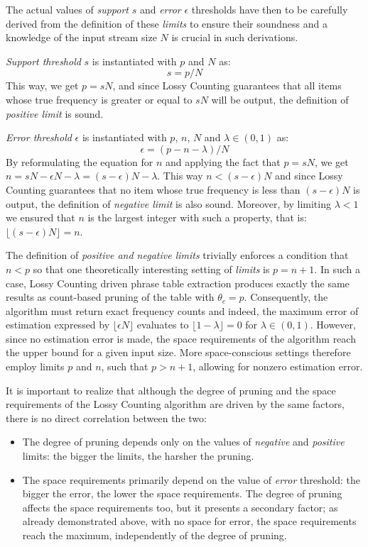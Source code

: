 The actual values of \emph{support} $s$ and \emph{error} $\epsilon$ thresholds have then
to be carefully derived from the definition of these \emph{limits} to ensure their soundness and
a knowledge of the input stream size $N$ is crucial in such derivations.

\emph{Support threshold} $s$ is instantiated with $p$ and $N$ as:
\begin{equation}
  s = p / N
\end{equation}
This way, we get $p = sN$, and since Lossy Counting guarantees that all items whose true
frequency is greater or equal to $sN$ will be output, the definition of \emph{positive limit} is sound.

\emph{Error threshold} $\epsilon$ is instantiated with $p$, $n$, $N$ and $\lambda \in (0,1)$ as:
\begin{equation}
\label{eq:epsilon}
  \epsilon = (p - n - \lambda) / N
\end{equation}
By reformulating the equation for $n$ and applying the fact that $p = sN$,
we get $n = sN - \epsilon N - \lambda = (s - \epsilon)N - \lambda$.
This way $n < (s - \epsilon)N$ and since Lossy Counting guarantees that no item whose
true frequency is less than $(s - \epsilon)N$ is output, the definition of
\emph{negative limit} is also sound.
Moreover, by limiting $\lambda < 1$ we ensured that $n$ is the largest integer with such
a property, that is: $\lfloor (s - \epsilon)N \rfloor = n$.

The definition of \emph{positive and negative limits} trivially enforces a condition that $n < p$ so that
one theoretically interesting setting of \emph{limits} is $p = n + 1$.
In such a case, Lossy Counting driven phrase table extraction produces exactly the same
results as count-based pruning of the table with $\theta_{c} = p$.
Consequently, the algorithm must return exact frequency counts and indeed,
the maximum error of estimation expressed by $\lfloor \epsilon N\rfloor $ evaluates to
$\lfloor 1 - \lambda \rfloor = 0$ for $\lambda \in (0,1)$.
However, since no estimation error is made, the space requirements of the algorithm
reach the upper bound for a given input size.
More space-conscious settings therefore employ limits $p$ and $n$,
such that $p > n + 1$, allowing for nonzero estimation error.

It is important to realize that although the degree of pruning and
the space requirements of the Lossy Counting algorithm are driven by the same factors,
there is no direct correlation between the two:
\begin{itemize}
  \item The degree of pruning depends only on the values of \emph{negative} and
    \emph{positive} limits: the bigger the limits, the harsher the pruning.
  \item The space requirements primarily depend on the value of \emph{error} threshold:
    the bigger the error, the lower the space requirements.
    The degree of pruning affects the space requirements too, but it presents
    a secondary factor; as already demonstrated above, with no space for error,
    the space requirements reach the maximum, independently of the degree of pruning.
\end{itemize}

